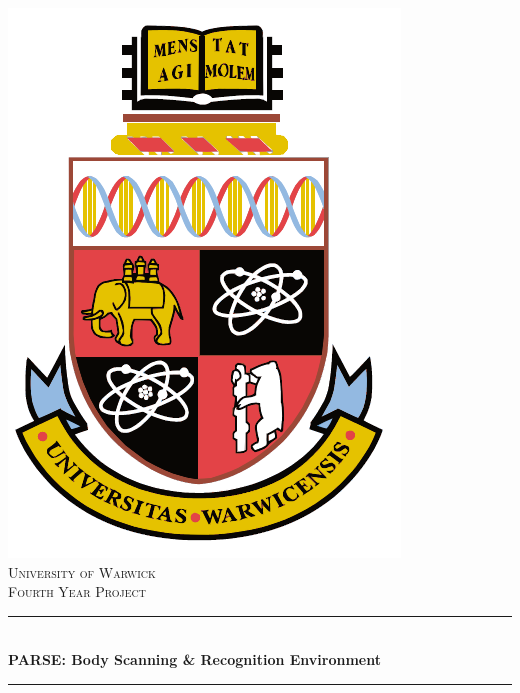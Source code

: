 \documentclass[11pt,english,twoside,openright]{report}
\newcommand{\HRule}{\rule{\linewidth}{0.5mm}}
\begin{document}
\sloppy %
\pagestyle{fancy}

\setcounter{page}{2}
\begin{titlepage}
\begin{center}


\includegraphics[scale=0.3]{warwickcrest.png}\\

\textsc{\LARGE University of Warwick}\\[1.5cm]

\textsc{\Large Fourth Year Project}\\[0.5cm]

\HRule \\[0.9cm]
{ \huge \bfseries PARSE: Body Scanning \& Recognition Environment}\\[0.6cm]

\HRule \\[1.5cm]


\end{center}
\end{titlepage}
\end{document}
